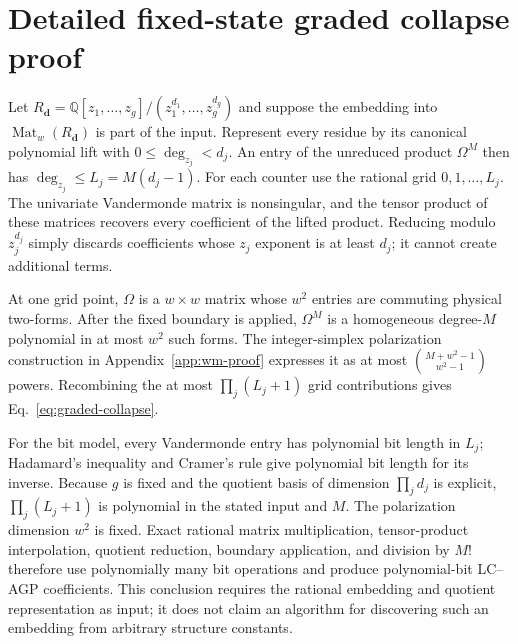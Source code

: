 \documentclass[aps,pra,reprint,superscriptaddress,nofootinbib,longbibliography,showkeys]{revtex4-2}
\theoremstyle{definition}
\newcommand{\Mat}{\operatorname{Mat}}
\begin{document}
\section{Detailed fixed-state graded collapse proof}
\label{app:graded-proof}

Let
$R_{\boldsymbol d}=\mathbb Q[z_1,\ldots,z_g]/
(z_1^{d_1},\ldots,z_g^{d_g})$ and suppose the embedding into
$\Mat_w(R_{\boldsymbol d})$ is part of the input.  Represent every residue by
its canonical polynomial lift with $0\le\deg_{z_j}<d_j$.  An entry of the
unreduced product $\Omega^M$ then has
$\deg_{z_j}\le L_j=M(d_j-1)$.  For each counter use the rational grid
$0,1,\ldots,L_j$.  The univariate Vandermonde matrix is nonsingular, and the
tensor product of these matrices recovers every coefficient of the lifted
product.  Reducing modulo $z_j^{d_j}$ simply discards coefficients whose
$z_j$ exponent is at least $d_j$; it cannot create additional terms.

At one grid point, $\Omega$ is a $w\times w$ matrix whose $w^2$ entries are
commuting physical two-forms.  After the fixed boundary is applied,
$\Omega^M$ is a homogeneous degree-$M$ polynomial in at most $w^2$ such forms.
The integer-simplex polarization construction in
Appendix~\ref{app:wm-proof} expresses it as at most
$\binom{M+w^2-1}{w^2-1}$ powers.  Recombining the at most
$\prod_j(L_j+1)$ grid contributions gives Eq.~\eqref{eq:graded-collapse}.

For the bit model, every Vandermonde entry has polynomial bit length in $L_j$;
Hadamard's inequality and Cramer's rule give polynomial bit length for its
inverse.  Because $g$ is fixed and the quotient basis of dimension
$\prod_jd_j$ is explicit, $\prod_j(L_j+1)$ is polynomial in the stated input
and $M$.  The polarization dimension $w^2$ is fixed.  Exact rational matrix
multiplication, tensor-product interpolation, quotient reduction, boundary
application, and division by $M!$ therefore use polynomially many bit
operations and produce polynomial-bit LC--AGP coefficients.  This conclusion
requires the rational embedding and quotient representation as input; it does
not claim an algorithm for discovering such an embedding from arbitrary
structure constants.



\end{document}
